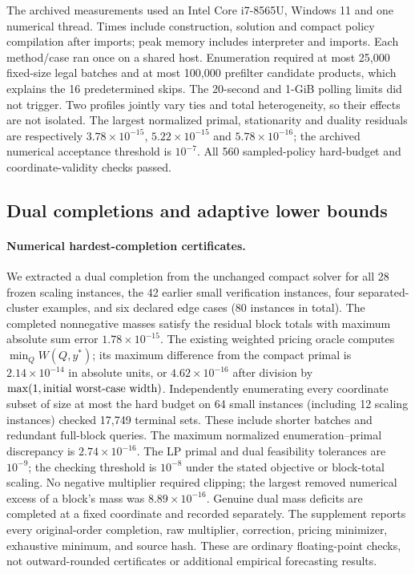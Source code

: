The archived measurements used an Intel Core i7-8565U, Windows 11 and one
numerical thread. Times include construction, solution and compact policy
compilation after imports; peak memory includes interpreter and imports.
Each method/case ran once on a shared host. Enumeration required at most
25,000 fixed-size legal batches and at most 100,000 prefilter candidate
products, which explains the 16 predetermined skips. The 20-second and
1-GiB polling limits did not trigger. Two profiles jointly vary ties and
total heterogeneity, so their effects are not isolated. The largest
normalized primal, stationarity and duality residuals are respectively
$3.78\times10^{-15}$, $5.22\times10^{-15}$ and $5.78\times10^{-16}$;
the archived numerical acceptance threshold is $10^{-7}$. All 560
sampled-policy hard-budget and coordinate-validity checks passed.

\subsection{Dual completions and adaptive lower bounds}
\paragraph{Numerical hardest-completion certificates.}
We extracted a dual completion from the unchanged compact solver for all
28 frozen scaling instances, the 42 earlier small verification instances,
four separated-cluster examples, and six declared edge cases (80 instances
in total). The completed nonnegative masses satisfy the residual block
totals with maximum absolute sum error $1.78\times10^{-15}$. The existing
weighted pricing oracle computes $\min_Q W(Q,y^*)$; its maximum difference
from the compact primal is $2.14\times10^{-14}$ in absolute units, or
$4.62\times10^{-16}$ after division by
$\max(1,\hbox{initial worst-case width})$. Independently enumerating every
coordinate subset of size at most the hard budget on 64 small instances
(including 12 scaling instances) checked 17,749 terminal sets. These
include shorter batches and redundant full-block queries. The maximum
normalized enumeration--primal discrepancy is $2.74\times10^{-16}$.
The LP primal and dual feasibility tolerances are $10^{-9}$; the checking
threshold is $10^{-8}$ under the stated objective or block-total scaling.
No negative multiplier required clipping; the largest removed numerical
excess of a block's mass was $8.89\times10^{-16}$. Genuine dual mass
deficits are completed at a fixed coordinate and recorded separately.
The supplement reports every original-order completion, raw multiplier,
correction, pricing minimizer, exhaustive minimum, and source hash.
These are ordinary floating-point checks, not outward-rounded
certificates or additional empirical forecasting results.

